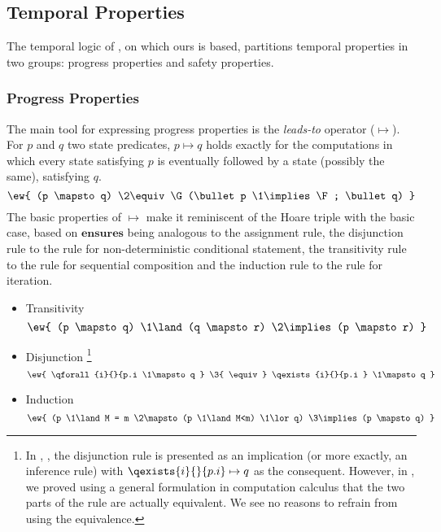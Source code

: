 \subsection{Temporal Properties}
\label{sec:temporal-properties}
The temporal logic of \unity, on which ours is based, partitions temporal properties in two groups: progress properties and safety properties.

\subsubsection{Progress Properties}
\label{sec:progress-properties}
The main tool for expressing progress properties is the
\emph{leads-to} operator ($\mapsto$). For $p$ and $q$ two state
predicates, $p \mapsto q$ holds exactly for the computations in which
every state satisfying $p$ is eventually followed by a state (possibly
the same), satisfying $q$.
%
\begin{equation}
	\ew{ (p \mapsto q) \2\equiv \G (\bullet p \1\implies \F ; \bullet q) }
\end{equation}
%
The basic properties of $\mapsto$ make it reminiscent of the Hoare triple with the basic case, based on $\textbf{ensures}$ being analogous to the assignment rule, the disjunction rule to the rule for non-deterministic conditional statement, the transitivity rule to the rule for sequential composition and the induction rule to the rule for iteration.
\begin{itemize}
\item Transitivity
	\begin{equation}
		\ew{ (p \mapsto q)  \1\land (q \mapsto r) \2\implies  (p \mapsto r) }
			\label{sem:prog:lt:transitivity}
	\end{equation}
\item Disjunction \footnote{
%
In \cite{DBLP:books/daglib/0067338}, \cite{DBLP:journals/csur/Misra96}, the disjunction rule is presented as an implication (or more exactly, an inference rule) with $\qexists{i}{}{p.i} \mapsto q$ as the consequent.  However, in \cite{thesis/hudon2011}, we proved using a general formulation in computation calculus that the two parts of the rule are actually equivalent.  We see no reasons to refrain from using the equivalence. }
	\begin{equation}
			\label{sem:prog:lt:disjunction} 
		\ew{ \qforall{i}{}{p.i \1\mapsto q }  \3{  \equiv }  \qexists{i}{}{p.i } \1\mapsto q  }
	\end{equation}
\item Induction
	\begin{equation}
	\ew{  (p \1\land M = m  \2\mapsto (p \1\land M<m) \1\lor q) \3\implies (p \mapsto q)  }
	\end{equation}
\end{itemize}


